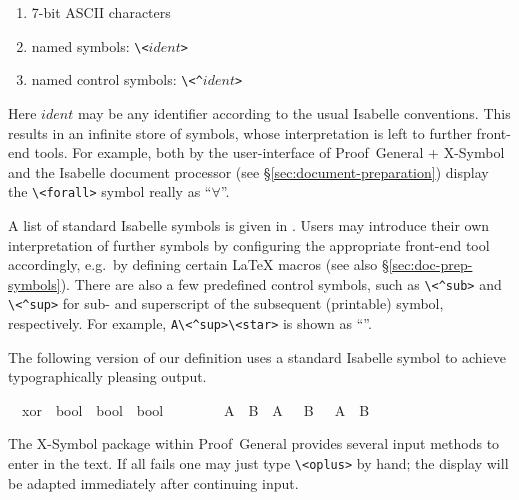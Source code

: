 \begin{isabellebody}
\begin{isamarkuptext}
\begin{enumerate}
  \item 7-bit ASCII characters

  \item named symbols: \verb,\,\verb,<,$ident$\verb,>,

  \item named control symbols: \verb,\,\verb,<^,$ident$\verb,>,

  \end{enumerate}

  Here $ident$ may be any identifier according to the usual Isabelle
  conventions.  This results in an infinite store of symbols, whose
  interpretation is left to further front-end tools.  For example,
  both by the user-interface of Proof~General + X-Symbol and the
  Isabelle document processor (see \S\ref{sec:document-preparation})
  display the \verb,\,\verb,<forall>, symbol really as ``$\forall$''.

  A list of standard Isabelle symbols is given in
  \cite[appendix~A]{isabelle-sys}.  Users may introduce their own
  interpretation of further symbols by configuring the appropriate
  front-end tool accordingly, e.g.\ by defining certain {\LaTeX}
  macros (see also \S\ref{sec:doc-prep-symbols}).  There are also a
  few predefined control symbols, such as \verb,\,\verb,<^sub>, and
  \verb,\,\verb,<^sup>, for sub- and superscript of the subsequent
  (printable) symbol, respectively.  For example, \verb,A\<^sup>\<star>, is
  shown as ``''.

  \medskip The following version of our  definition uses a
  standard Isabelle symbol to achieve typographically pleasing output.%
\end{isamarkuptext}%
\isamarkuptrue%
\isamarkupfalse%
\isamarkupfalse%
\isanewline
\ \ xor\ {\isacharcolon}{\isacharcolon}\ {\isachardoublequote}bool\ {\isasymRightarrow}\ bool\ {\isasymRightarrow}\ bool{\isachardoublequote}\ \ \ \ {\isacharparenleft}\ {\isachardoublequote}{\isasymoplus}{\isachardoublequote}\ {}{}{\isacharparenright}\isanewline
\ \ {\isachardoublequote}A\ {\isasymoplus}\ B\ {\isasymequiv}\ {\isacharparenleft}A\ {\isasymand}\ {\isasymnot}\ B{\isacharparenright}\ {\isasymor}\ {\isacharparenleft}{\isasymnot}\ A\ {\isasymand}\ B{\isacharparenright}{\isachardoublequote}\isamarkupfalse%
\isamarkupfalse%
%
\begin{isamarkuptext}%
\noindent The X-Symbol package within Proof~General provides several
  input methods to enter \isa{{\isasymoplus}} in the text.  If all fails one may
  just type \verb,\,\verb,<oplus>, by hand; the display will be
  adapted immediately after continuing input.


\end{isamarkuptext}
\end{isabellebody}
